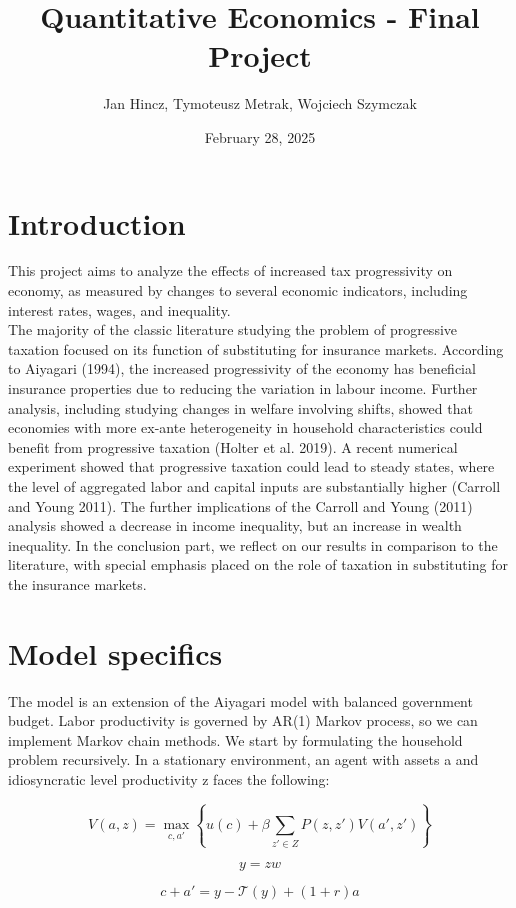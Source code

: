 \documentclass{article}
\title{Quantitative Economics - Final Project}
\author{Jan Hincz, Tymoteusz Metrak, Wojciech Szymczak}
\date{February 28, 2025}
\begin{document}
\maketitle


\section*{Introduction}
This project aims to analyze the effects of increased tax progressivity on economy, as measured by changes to several economic indicators, including interest rates, wages, and inequality. 
\\
\newline
The majority of the classic literature studying the problem of progressive taxation focused on its function of substituting for insurance markets. According to Aiyagari (1994), the increased progressivity of the economy has beneficial insurance properties due to reducing the variation in labour income. Further analysis, including studying changes in welfare involving shifts, showed that economies with more ex-ante heterogeneity in household characteristics could benefit from progressive taxation (Holter et al. 2019). A recent numerical experiment showed that progressive taxation could lead to steady states, where the level of aggregated labor and capital inputs are substantially higher (Carroll and Young 2011). The further implications of the Carroll and Young (2011) 
 analysis showed a decrease in income inequality, but an increase in wealth inequality. In the conclusion part, we reflect on our results in comparison to the literature, with special emphasis placed on the role of taxation in substituting for the insurance markets. 


\section*{Model specifics}

The model is an extension of the Aiyagari model with balanced government budget. Labor productivity is governed by AR(1) Markov process, so we can implement Markov chain methods. We start by formulating the household problem recursively. In a stationary environment, an agent with assets a and idiosyncratic level productivity z faces the following:

\[
V(a, z) = \max_{c, a'} \left\{ u(c) + \beta \sum_{z' \in Z} P(z, z') V(a', z') \right\}
\]

\[
y = zw 
\]

\[
c + a' = y - \mathcal{T}(y) + (1 + r) a 
\]
\end{document}
